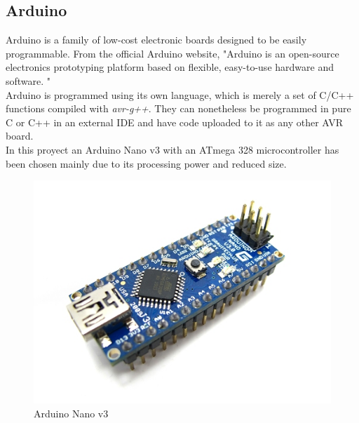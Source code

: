 \newpage
\subsection{Arduino}

	Arduino is a family of low-cost electronic boards designed to be easily programmable. From the official Arduino website, "Arduino is an open-source electronics prototyping platform based on flexible, easy-to-use hardware and software. "\\

	Arduino is programmed using its own language, which is merely a set of C/C++ functions compiled with \textit{avr-g++}. They can nonetheless be programmed in pure C or C++ in an external IDE and have code uploaded to it as any other AVR board.\\

	In this proyect an Arduino Nano v3 with an ATmega 328 microcontroller has been chosen mainly due to its processing power and reduced size.
		
		\begin{figure}[H]
			\centering
			\includegraphics[scale=0.4]{images/ProjectComponents/arduino.jpg}
			\caption{Arduino Nano v3 }
			\label{}
		\end{figure}
		\bigskip

